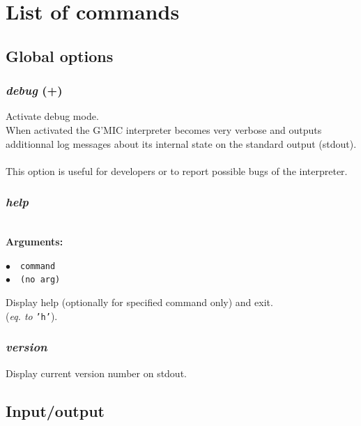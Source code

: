 \documentclass[a4paper,10.5pt,twoside]{book}
\def\comma{\discretionary{,}{}{,}}
\newcommand{\Cb}[1]{\textcolor{cb}{#1}}
\begin{document}
\chapter{List of commands}

\section{Global options}


\subsection{\emph{debug} (+)}\vspace*{-0.7em}
Activate debug mode.
~\\When activated{\comma} the G'MIC interpreter becomes very verbose and outputs additionnal log
messages about its internal state on the standard output (stdout).
~\\This option is useful for developers or to report possible bugs of the interpreter.


\subsection{\emph{help} }\vspace*{-0.7em}
~\\\textbf{\Cb{Arguments: }}\begin{flushleft}
{\small \Cb{\hspace*{0.5cm}$\bullet$~~\texttt{command}}}~~~\\
{\small \Cb{\hspace*{0.5cm}$\bullet$~~\texttt{(no arg)}}}\end{flushleft}
Display help (optionally for specified command only) and exit.
~\\(\emph{eq. to} {\small \texttt{'h'}}).


\subsection{\emph{version} }\vspace*{-0.7em}
Display current version number on stdout.

\section{Input/output}
\end{document}
